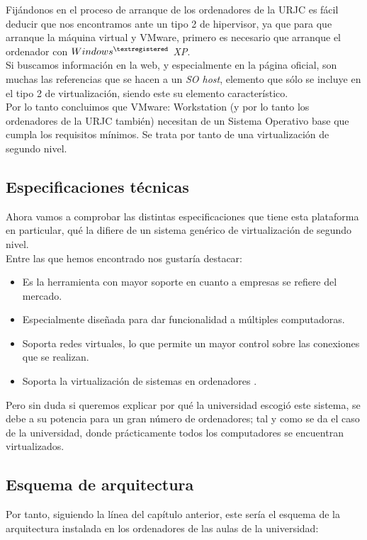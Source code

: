 Fijándonos en el proceso de arranque de los ordenadores de la URJC es fácil deducir que nos encontramos ante un tipo 2 de hipervisor, ya que para que arranque la máquina virtual y VMware, primero es necesario que arranque el ordenador con \emph{$Windows^{\textregistered}$ XP}.\\

Si buscamos información en la web\cite{refvmware1}, y especialmente en la página oficial\cite{vmwareworkguiaso}\cite{refvmware2}, son muchas las referencias que se hacen a un \emph{SO host}, elemento que sólo se incluye en el tipo 2 de virtualización, siendo este su elemento característico.\\

Por lo tanto concluimos que VMware: Workstation (y por lo tanto los ordenadores de la URJC también) necesitan de un Sistema Operativo base que cumpla los requisitos mínimos. Se trata por tanto de una virtualización de segundo nivel.

\subsection{Especificaciones técnicas}
Ahora vamos a comprobar las distintas especificaciones que tiene esta plataforma en particular, qué la difiere de un sistema genérico de virtualización de segundo nivel.\\

Entre las que hemos encontrado nos gustaría destacar:

\begin{itemize}
\item Es la herramienta con mayor soporte en cuanto a empresas se refiere del mercado.
\item Especialmente diseñada para dar funcionalidad a múltiples computadoras.
\item Soporta redes virtuales, lo que permite un mayor control sobre las conexiones que se realizan.
\item Soporta la virtualización de sistemas  en ordenadores .
\end{itemize}

Pero sin duda si queremos explicar por qué la universidad escogió este sistema, se debe a su potencia para un gran número de ordenadores; tal y como se da el caso de la universidad, donde prácticamente todos los computadores se encuentran virtualizados.

\subsection{Esquema de arquitectura}
Por tanto, siguiendo la línea del capítulo anterior, este sería el esquema de la arquitectura instalada en los ordenadores de las aulas de la universidad:

